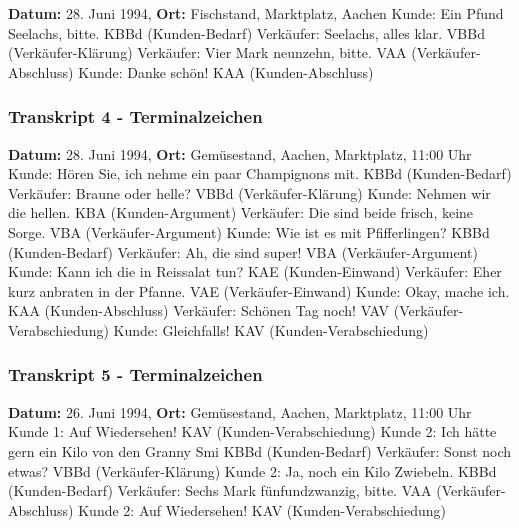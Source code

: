 \documentclass[
]{article}
\begin{document}
\textbf{Datum:} 28. Juni 1994, \textbf{Ort:} Fischstand, Marktplatz,
Aachen\textbar{} Kunde: Ein Pfund Seelachs, bitte. \textbar{} KBBd
(Kunden-Bedarf) \textbar{} Verkäufer: Seelachs, alles klar. \textbar{}
VBBd (Verkäufer-Klärung) \textbar{} Verkäufer: Vier Mark neunzehn,
bitte. \textbar{} VAA (Verkäufer-Abschluss) \textbar{} Kunde: Danke
schön! \textbar{} KAA (Kunden-Abschluss)

\subsubsection{\texorpdfstring{\textbf{Transkript 4 -
Terminalzeichen}}{Transkript 4 - Terminalzeichen}}\label{transkript-4---terminalzeichen}

\textbf{Datum:} 28. Juni 1994, \textbf{Ort:} Gemüsestand, Aachen,
Marktplatz, 11:00 Uhr\textbar{} Kunde: Hören Sie, ich nehme ein paar
Champignons mit. \textbar{} KBBd (Kunden-Bedarf) \textbar{} Verkäufer:
Braune oder helle? \textbar{} VBBd (Verkäufer-Klärung) \textbar{} Kunde:
Nehmen wir die hellen. \textbar{} KBA (Kunden-Argument) \textbar{}
Verkäufer: Die sind beide frisch, keine Sorge. \textbar{} VBA
(Verkäufer-Argument) \textbar{} Kunde: Wie ist es mit Pfifferlingen?
\textbar{} KBBd (Kunden-Bedarf) \textbar{} Verkäufer: Ah, die sind
super! \textbar{} VBA (Verkäufer-Argument) \textbar{} Kunde: Kann ich
die in Reissalat tun? \textbar{} KAE (Kunden-Einwand) \textbar{}
Verkäufer: Eher kurz anbraten in der Pfanne. \textbar{} VAE
(Verkäufer-Einwand) \textbar{} Kunde: Okay, mache ich. \textbar{} KAA
(Kunden-Abschluss) \textbar{} Verkäufer: Schönen Tag noch! \textbar{}
VAV (Verkäufer-Verabschiedung) \textbar{} Kunde: Gleichfalls! \textbar{}
KAV (Kunden-Verabschiedung)

\subsubsection{\texorpdfstring{\textbf{Transkript 5 -
Terminalzeichen}}{Transkript 5 - Terminalzeichen}}\label{transkript-5---terminalzeichen}

\textbf{Datum:} 26. Juni 1994, \textbf{Ort:} Gemüsestand, Aachen,
Marktplatz, 11:00 Uhr\textbar{} Kunde 1: Auf Wiedersehen! \textbar{} KAV
(Kunden-Verabschiedung) \textbar{} Kunde 2: Ich hätte gern ein Kilo von
den Granny Smi\textbar{} KBBd (Kunden-Bedarf) \textbar{} Verkäufer:
Sonst noch etwas? \textbar{} VBBd (Verkäufer-Klärung) \textbar{} Kunde
2: Ja, noch ein Kilo Zwiebeln. \textbar{} KBBd (Kunden-Bedarf)
\textbar{} Verkäufer: Sechs Mark fünfundzwanzig, bitte. \textbar{} VAA
(Verkäufer-Abschluss) \textbar{} Kunde 2: Auf Wiedersehen! \textbar{}
KAV (Kunden-Verabschiedung)
\end{document}
